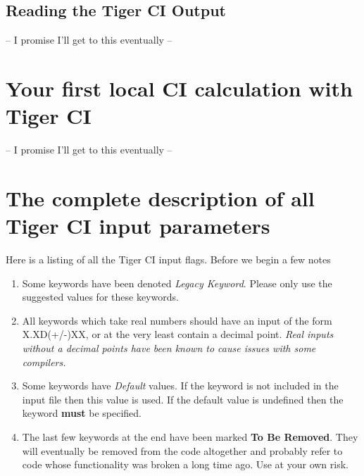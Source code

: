 \documentclass{article}
\begin{document}
\clearpage


\subsection{Reading the Tiger CI Output}
-- I promise I'll get to this eventually --

\section{Your first local CI calculation with Tiger CI}
-- I promise I'll get to this eventually --

\section{The complete description of all Tiger CI input parameters}

Here is a listing of all the Tiger CI input flags. Before we begin a few notes
\begin{enumerate}
	\item Some keywords have been denoted \emph{Legacy Keyword}. Please only use the suggested values for these keywords.
	\item All keywords which take real numbers should have an input of the form X.XD(+/-)XX, or at the very least contain a decimal point. \emph{Real inputs without a decimal points have been known to cause issues with some compilers.}
	\item Some keywords have \emph{Default} values. If the keyword is not included in the input file then this value is used. If the default value is undefined then the keyword \textbf{must} be specified.
	\item The last few keywords at the end have been marked \textbf{To Be Removed}. They will eventually be removed from the code altogether and probably refer to code whose functionality was broken a long time ago. Use at your own risk. 
\end{enumerate}
\end{document}
